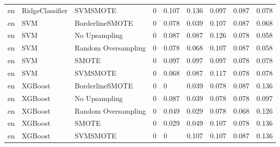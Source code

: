\begin{tabular}{lllllllll}
      en &              RidgeClassifier &            SVMSMOTE &     0 &                     0.107 &                 0.136 &                  0.097 &                                   0.087 &     0.078 \\
      en &                          SVM &     BorderlineSMOTE &     0 &                     0.078 &                 0.039 &                  0.107 &                                   0.087 &     0.068 \\
      en &                          SVM &       No Upsampling &     0 &                     0.087 &                 0.087 &                  0.126 &                                   0.078 &     0.058 \\
      en &                          SVM & Random Oversampling &     0 &                     0.078 &                 0.068 &                  0.107 &                                   0.087 &     0.058 \\
      en &                          SVM &               SMOTE &     0 &                     0.097 &                 0.097 &                  0.097 &                                   0.078 &     0.078 \\
      en &                          SVM &            SVMSMOTE &     0 &                     0.068 &                 0.087 &                  0.117 &                                   0.078 &     0.078 \\
      en &                      XGBoost &     BorderlineSMOTE &     0 &                         0 &                 0.039 &                  0.078 &                                   0.087 &     0.136 \\
      en &                      XGBoost &       No Upsampling &     0 &                     0.087 &                 0.039 &                  0.078 &                                   0.078 &     0.097 \\
      en &                      XGBoost & Random Oversampling &     0 &                     0.049 &                 0.029 &                  0.078 &                                   0.068 &     0.126 \\
      en &                      XGBoost &               SMOTE &     0 &                     0.029 &                 0.049 &                  0.107 &                                   0.078 &     0.136 \\
      en &                      XGBoost &            SVMSMOTE &     0 &                         0 &                 0.107 &                  0.107 &                                   0.087 &     0.136 \\

\end{tabular}
